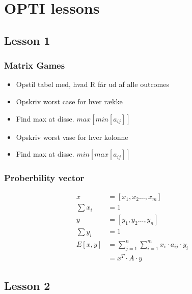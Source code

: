 \documentclass[10pt, a4]{Memoir}
\begin{document}
\chapter{OPTI lessons}

\section{Lesson 1} %
\label{sec:lesson_1}

\subsection{Matrix Games}

\begin{itemize}
	\item Opstil tabel med, hvad R får ud af alle outcomes
	\item Opskriv worst case for hver række
	\item[] Find max at disse. $max[min[a_{ij}]]$
	\item Opskriv worst vase for hver kolonne
	\item[] Find max at disse.  $min[max[a_{ij}]]$
\end{itemize}

\subsection{Proberbility vector}

\begin{align}
x &= [x_1, x_2 \ldots, x_m] \\
\sum x_i &= 1\\
y &= [y_1, y_2 \ldots, y_n] \\
\sum y_i &= 1\\
E[x,y] &= \sum_{j=1}^n \sum_{i=1}^m x_i \cdot a_{ij} \cdot y_i \\
	&= x^T \cdot A \cdot y
\end{align}




\section{Lesson 2}
\end{document}
